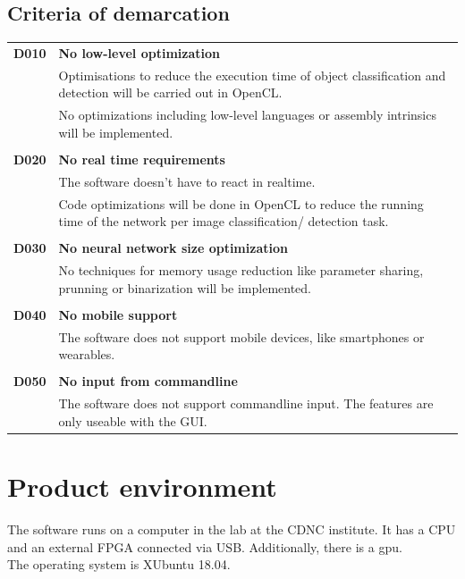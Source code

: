 \documentclass[parskip=full]{scrartcl}
\begin{document}
\subsection{Criteria of demarcation}
\begin{tabular}{p{2cm}p{12cm}}
\textbf{D010} & \textbf{No low-level optimization}\\
& Optimisations to reduce the execution time of object classification and detection will  be carried out in OpenCL.\\
& No optimizations including low-level languages or assembly intrinsics will be implemented.\\
&\\
\textbf{D020} & \textbf{No real time requirements}\\
& The software doesn't have to react in realtime. \\
& Code optimizations will be done in OpenCL to reduce the running time of the network per \gls{image classification}/ detection task.\\
&\\
\textbf{D030} & \textbf{No neural network size optimization}\\
& No techniques for memory usage reduction like parameter sharing, prunning or binarization will be implemented.\\
&\\
\textbf{D040} & \textbf{No mobile support}\\
& The software does not support mobile devices, like smartphones or wearables.\\
& \\
\textbf{D050} & \textbf{No input from commandline}\\
& The software does not support commandline input. The features are only useable with the GUI.
\end{tabular}


\section{Product environment}
The software runs on a computer in the lab at the CDNC institute. It has a CPU and an external FPGA connected via USB. Additionally, there is a \gls{gpu}.\\ 
The operating system is XUbuntu 18.04.
\end{document}
